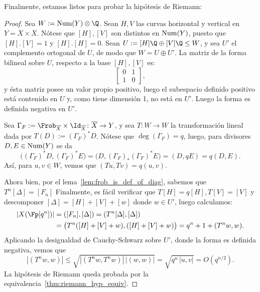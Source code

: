 Finalmente, estamos listos para probar la hipótesis de Riemann:
\begin{proof}
	Sea $W := \Num(Y) \otimes \Q$. Sean $H, V$ las curvas horizontal y vertical en $Y = \overline{X} \times \overline{X}$.
	Nótese que $[H], [V]$ son distintos en $\operatorname{Num}(Y)$, puesto que $[H].[V] = 1$ y $[H].[H] = 0$.
	Sean $U := [H]\Q \oplus [V]\Q \le W$, y sea $U'$ el complemento ortogonal de $U$, de modo que $W = U \oplus U'$.
	La matriz de la forma bilineal sobre $U$, respecto a la base $[H], [V]$ es:
	$$ \begin{bmatrix}
		0 & 1 \\
		1 & 0
	\end{bmatrix}, $$
	y ésta matriz posee un valor propio positivo, luego el subespacio definido positivo está contenido en $U$ y, como tiene dimensión 1,
	no está en $U'$.
	Luego la forma es definida negativa en $U'$.

	Sea $\Gamma_F := \Frob_{\overline{X}} \times \Id_{\overline{X}} \colon \overline{X} \to Y$,
	y sea $T \colon W \to W$ la transformación lineal dada por $T(D) := (\Gamma_F)^* D$.
	Nótese que $\deg(\Gamma_F) = q$, luego, para divisores $D, E \in \operatorname{Num}(Y)$ se da
	$$ \big( (\Gamma_F)^*D, (\Gamma_F)^*E \big) = \big( D, (\Gamma_F)_*(\Gamma_F)^*E \big) = (D, qE) = q(D, E). $$
	Así, para $u, v \in W$, vemos que $(Tu, Tv) = q(u, v)$.

	Ahora bien, por el lema~\ref{lem:frob_is_def_of_diag}, sabemos que $T^n[\Delta] = [F_n]$
	Finalmente, es fácil verificar que $T[H] = q[H], T[V] = [V]$ y descomponer $[\Delta] = [H] + [V] + [w]$ donde $w \in U'$,
	luego calculamos:
	\begin{align*}
		|X(\Fp[q^n])| &= ([F_n], [\Delta]) = (T^n[\Delta], [\Delta]) \\
			      &= \big( T^n([H] + [V] + w), ([H] + [V] + w) \big) = q^n + 1 + (T^n w, w).
	\end{align*}
	Aplicando la desigualdad de Cauchy-Schwarz sobre $U'$, donde la forma es definida negativa, vemos que
	$$ |(T^n w, w)| \le \sqrt{|(T^nw, T^nw)| \, |(w, w)|} = \sqrt{q^n \, |u, v|} = O(q^{n/2}). $$
	La hipótesis de Riemann queda probada por la equivalencia~\ref{thm:riemann_hyp_equiv}.
\end{proof}
